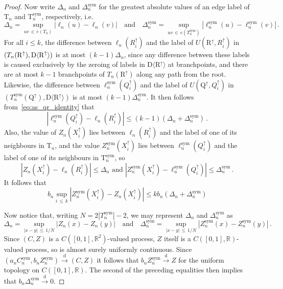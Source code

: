 \documentclass[10pt]{amsart}
\theoremstyle{definition}\newtheorem{defi}[theo]{Definition}\newtheorem{rema}[theo]{Remark}\newtheorem{exam}[theo]{Example}\newtheorem{exem}[theo]{Example}\newtheorem{nota}[theo]{Notation}
\providecommand{\R}{}
\renewcommand{\R}{\mathbb{R}}
\newcommand{\rD}{\mathrm{D}}
\newcommand{\rQ}{\mathrm{Q}}
\newcommand{\rR}{\mathrm{R}}
\newcommand{\rT}{\mathrm{T}}
\DeclareMathOperator{\sym}{sym}
\newcommand{\unif}{\ensuremath{X}}
\newcommand{\angles}[1]{\langle #1 \rangle}
\newcommand{\convdist}{\ensuremath{\stackrel{\mathrm{d}}{\rightarrow}}}
\begin{document}
\begin{proof}
Now write $\Delta_n$ and $\Delta_n^{\sym}$ for the greatest absolute values of an edge label of $\rT_n$ and $\rT_n^{\sym}$, respectively, i.e.
\[
\Delta_n =
\sup_{uv\,\in\,e(T_n)} \left|\ell_n(u)-\ell_n(v)\right| \quad \text{and} \quad
\Delta_n^{\sym} = \sup_{uv\,\in\,e\left(T_n^{\sym}\right)} \left|\ell_n^{\sym}(u)-\ell_n^{\sym}(v)\right|\,.
\]
For all $i \le k$, the difference between $\ell_n(R_i^\uparrow)$ and the label of $U(\rR^\uparrow,R_i^\uparrow)$ in $(T_n(\rR^\uparrow),\linebreak\rD\angles{\rR^\uparrow})$ is at most $(k-1) \Delta_n$, since any difference between these labels is caused exclusively by the zeroing of labels in $\rD\angles{\rR^\uparrow}$ at branchpoints, and there are at most $k-1$ branchpoints of $T_n(\rR^\uparrow)$ along any path from the root. Likewise, the difference between $\ell_n^{\sym}(Q_i^\uparrow)$ and the label of $U(\rQ^\uparrow,Q_i^\uparrow)$ in $(T_n^{\sym}(\rQ^\uparrow),\rD\angles{\rR^\uparrow})$ is at most $(k-1) \Delta_n^{\sym}$. It then follows from~\eqref{eq:as_qr_identity} that
\[
\left|\ell_n^{\sym}\left(Q_i^\uparrow\right)-\ell_n\left(R_i^\uparrow\right)\right|
\le (k-1)\left(\Delta_n+\Delta_n^{\sym}\right)\,.
\]
Also, the value of $Z_n(\unif_i^\uparrow)$ lies between $\ell_n(R_i^\uparrow)$ and the label of one of its neighbours in $\rT_n$, and the value $Z_n^{\sym}(\unif_i^\uparrow)$ lies between $\ell_n^{\sym}(Q_i^\uparrow)$ and the label of one of its neighbours in $\rT_n^{\sym}$, so
\[
\left|Z_n\left(\unif_i^\uparrow\right) - \ell_n\left(R_i^\uparrow\right)\right| \le \Delta_n
\text{ and } \left|Z_n^{\sym}\left(\unif_i^\uparrow\right) - \ell_n^{\sym}\left(Q_i^\uparrow\right)\right|
\le \Delta_n^{\sym}\,.
\]
It follows that
\begin{equation}\label{eq:z_diff_delta_bd}
b_n \sup_{i\,\le\,k} \left|Z_n^{\sym}\left(\unif_i^\uparrow\right) - Z_n\left(\unif_i^\uparrow\right)\right| \le k b_n \left(\Delta_n+\Delta_n^{\sym}\right)
\end{equation}

Now notice that, writing $N=2|T_n^{\sym}|-2$, we may represent $\Delta_n$ and $\Delta_n^{\sym}$ as
\[
\Delta_n = \sup_{|x-y|\,\le\,1/N} \left|Z_n(x)-Z_n(y)\right|
\quad \text{and} \quad
\Delta_n^{\sym} = \sup_{|x-y|\,\le\,1/N} \left|Z_n^{\sym}(x)-Z_n^{\sym}(y)\right|\,.
\]
Since $(C,Z)$ is a $C([0,1],\R^2)$-valued process, $Z$ itself is a $C([0,1],\R)$-valued process, so is almost surely uniformly continuous. Since $(a_nC_n^{\sym},b_nZ_n^{\sym}) \convdist (C,Z)$ it follows that $b_n Z_n^{\sym} \convdist Z$ for the uniform topology on $C([0,1],\R)$. The second of the preceding equalities then implies that $b_n \Delta_n^{\sym} \convdist 0$.


\end{proof}
\end{document}
